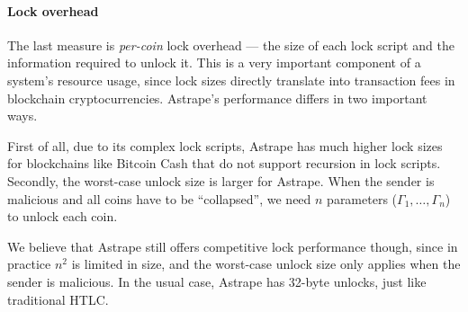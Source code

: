 \documentclass[USenglish,oneside,twocolumn]{article}
\begin{document}
\paragraph*{Lock overhead}

The last measure is \emph{per-coin} lock overhead --- the size of each lock script and the information required to unlock it. This is a very important component of a system's resource usage, since lock sizes directly translate into transaction fees in blockchain cryptocurrencies. Astrape's performance differs in two important ways.

First of all, due to its complex lock scripts, Astrape has much higher lock sizes for blockchains like Bitcoin Cash that do not support recursion in lock scripts. Secondly, the worst-case unlock size is larger for Astrape. When the sender is malicious and all coins have to be ``collapsed'', we need $n$ parameters ($\Gamma_1, \dots, \Gamma_n$) to unlock each coin.

We believe that Astrape still offers competitive lock performance though, since in practice $n^2$ is limited in size, and the worst-case unlock size only applies when the sender is malicious. In the usual case, Astrape has 32-byte unlocks, just like traditional HTLC.




\end{document}

